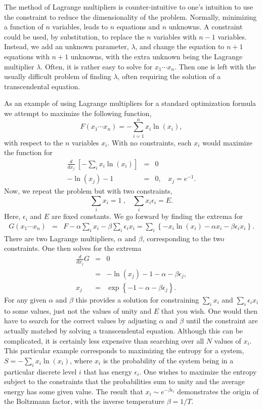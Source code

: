 The method of Lagrange multipliers is counter-intuitive to one's
intuition to use the constraint to reduce the dimensionality of the
problem. Normally, minimizing a function of $n$ variables, leads to
$n$ equations and $n$ unknowns. A constraint could be used, by
substitution, to replace the $n$ variables with $n-1$
variables. Instead, we add an unknown parameter, $\lambda$, and change
the equation to $n+1$ equations with $n+1$ unknowns, with the extra
unknown being the Lagrange multiplier $\lambda$. Often, it is rather
easy to solve for $x_1\cdots x_n$. Then one is left with the usually
difficult problem of finding $\lambda$, often requiring the solution
of a transcendental equation.

\example As an example of using Lagrange multipliers for a standard
optimization formula we attempt to maximize the following function,
\[
F(x_1\cdots x_n)=-\sum_{i=1}^n x_i\ln(x_i),
\]
with respect to the $n$ variables $x_i$. With no constraints, each
$x_i$ would maximize the function for
\begin{eqnarray*}
\frac{d}{dx_j}~\left[-\sum_i
  x_i\ln(x_i)\right]&=&0\\ -\ln(x_j)-1&=&0,~~~~x_j=e^{-1}.
\end{eqnarray*}
Now, we repeat the problem but with two constraints,
\[
\sum_ix_i=1~,~~~~\sum_ix_i\epsilon_i=E.
\]
Here, $\epsilon_i$ and $E$ are fixed constants. We go forward by
finding the extrema for
\begin{eqnarray*}
G(x_1\cdots x_n)&=&F-\alpha\sum_i x_i-\beta\sum_i\epsilon_ix_i =\sum_i
\left\{-x_i\ln(x_i)-\alpha x_i-\beta\epsilon_ix_i\right\}.
\end{eqnarray*}
There are two Lagrange multipliers, $\alpha$ and $\beta$,
corresponding to the two constraints. One then solves for the extrema
\begin{eqnarray*}
\frac{d}{dx_j}G&=&0\\ &=&-\ln(x_j)-1-\alpha-\beta\epsilon_j,\\ x_j&=&\exp\left\{-1-\alpha-\beta\epsilon_j\right\}.
\end{eqnarray*}
For any given $\alpha$ and $\beta$ this provides a solution for
constraining $\sum_i x_i$ and $\sum_i\epsilon_ix_i$ to some values,
just not the values of unity and $E$ that you wish. One would then
have to search for the correct values by adjusting $\alpha$ and
$\beta$ until the constraint are actually matched by solving a
transcendental equation. Although this can be complicated, it is
certainly less expensive than searching over all $N$ values of
$x_i$. This particular example corresponds to maximizing the entropy
for a system, $S=-\sum_i x_i\ln(x_i)$, where $x_i$ is the probability
of the system being in a particular discrete level $i$ that has energy
$\epsilon_i$. One wishes to maximize the entropy subject to the
constraints that the probabilities sum to unity and the average energy
has some given value. The result that $x_i\sim e^{-\beta\epsilon_i}$
demonstrates the origin of the Boltzmann factor, with the inverse
temperature $\beta=1/T$.

